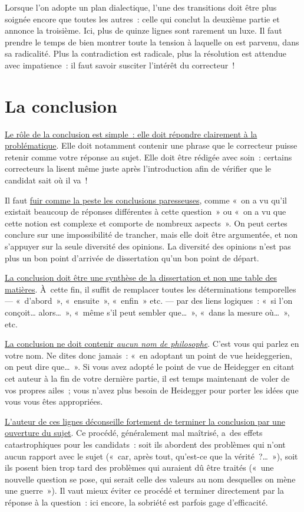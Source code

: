 \documentclass[a4paper,12pt]{report}
\begin{document}
Lorsque l'on adopte un plan dialectique, l'une des transitions doit être
plus soignée encore que toutes les autres : celle qui conclut la
deuxième partie et annonce la troisième. Ici, plus de quinze lignes sont
rarement un luxe. Il faut prendre le temps de bien montrer toute la
tension à laquelle on est parvenu, dans sa radicalité. Plus la
contradiction est radicale, plus la résolution est attendue avec
impatience : il faut savoir susciter l'intérêt du correcteur !

\chapter{La conclusion}
\label{sec:orgb29a081}
\label{org2f51e6d}

\uline{Le rôle de la conclusion est simple : elle doit répondre clairement à
la problématique}. Elle doit notamment contenir une phrase que le
correcteur puisse retenir comme votre réponse au sujet. Elle doit être
rédigée avec soin : certains correcteurs la lisent même juste après
l'introduction afin de vérifier que le candidat sait où il va !

Il faut \uline{fuir comme la peste les conclusions paresseuses}, comme « on a
vu qu'il existait beaucoup de réponses différentes à cette question » ou
« on a vu que cette notion est complexe et comporte de nombreux
aspects ». On peut certes conclure sur une impossibilité de trancher,
mais elle doit être argumentée, et non s'appuyer sur la seule diversité
des opinions. La diversité des opinions n'est pas plus un bon point
d'arrivée de dissertation qu'un bon point de départ.

\uline{La conclusion doit être une synthèse de la dissertation et non une
table des matières}. À cette fin, il suffit de remplacer toutes les
déterminations temporelles --- « d'abord », « ensuite », « enfin » etc.
--- par des liens logiques : « si l'on conçoit\ldots{} alors\ldots{} », « même
s'il peut sembler que\ldots{} », « dans la mesure où\ldots{} », etc.

\uline{La conclusion ne doit contenir \emph{aucun nom de philosophe}}. C'est vous
qui parlez en votre nom. Ne dites donc jamais : « en adoptant un point
de vue heideggerien, on peut dire que\ldots{} ». Si vous avez adopté le point
de vue de Heidegger en citant cet auteur à la fin de votre dernière
partie, il est temps maintenant de voler de vos propres ailes ; vous
n'avez plus besoin de Heidegger pour porter les idées que vous vous êtes
appropriées.

\uline{L'auteur de ces lignes déconseille fortement de terminer la conclusion
par une ouverture du sujet}. Ce procédé, généralement mal maîtrisé,
a des effets catastrophiques pour les candidats : soit ils abordent des
problèmes qui n'ont aucun rapport avec le sujet (« car, après tout,
qu'est-ce que la vérité ?\ldots{} »), soit ils posent bien trop tard des
problèmes qui auraient dû être traités (« une nouvelle question se pose,
qui serait celle des valeurs au nom desquelles on mène une guerre »). Il
vaut mieux éviter ce procédé et terminer directement par la réponse à la
question : ici encore, la sobriété est parfois gage d'efficacité.
\end{document}

